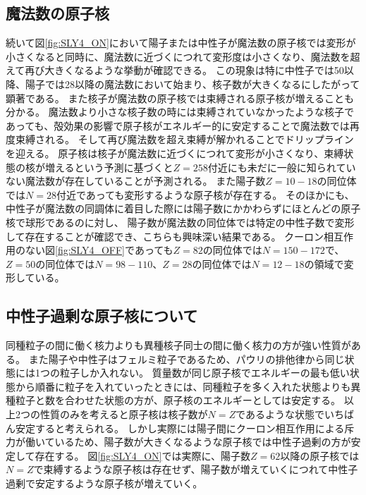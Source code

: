 \documentclass[12pt]{jarticle}
\begin{document}
\subsection{魔法数の原子核}
続いて図\ref{fig:SLY4_ON}において陽子または中性子が魔法数の原子核では変形が小さくなると同時に、魔法数に近づくにつれて変形度は小さくなり、魔法数を超えて再び大きくなるような挙動が確認できる。
この現象は特に中性子では50以降、陽子では28以降の魔法数において始まり、核子数が大きくなるにしたがって顕著である。
また核子が魔法数の原子核では束縛される原子核が増えることも分かる。
魔法数より小さな核子数の時には束縛されていなかったような核子であっても、殻効果の影響で原子核がエネルギー的に安定することで魔法数では再度束縛される。
そして再び魔法数を超え束縛が解かれることでドリップラインを迎える。
原子核は核子が魔法数に近づくにつれて変形が小さくなり、束縛状態の核が増えるという予測に基づくと$Z=258$付近にも未だに一般に知られていない魔法数が存在していることが予測される。
また陽子数$Z=10-18$の同位体では$N=28$付近であっても変形するような原子核が存在する。
そのほかにも、中性子が魔法数の同調体に着目した際には陽子数にかかわらずにほとんどの原子核で球形であるのに対し、
陽子数が魔法数の同位体では特定の中性子数で変形して存在することが確認でき、こちらも興味深い結果である。
クーロン相互作用のない図\ref{fig:SLY4_OFF}であっても$Z=82$の同位体では$N=150-172$で、
$Z=50$の同位体では$N=98-110$、$Z=28$の同位体では$N=12-18$の領域で変形している。

\subsection{中性子過剰な原子核について}
同種粒子の間に働く核力よりも異種核子同士の間に働く核力の方が強い性質がある。
また陽子や中性子はフェルミ粒子であるため、パウリの排他律から同じ状態には1つの粒子しか入れない。
質量数が同じ原子核でエネルギーの最も低い状態から順番に粒子を入れていったときには、同種粒子を多く入れた状態よりも異種粒子と数を合わせた状態の方が、原子核のエネルギーとしては安定する。
以上2つの性質のみを考えると原子核は核子数が$N=Z$であるような状態でいちばん安定すると考えられる。
しかし実際には陽子間にクーロン相互作用による斥力が働いているため、陽子数が大きくなるような原子核では中性子過剰の方が安定して存在する。
図\ref{fig:SLY4_ON}では実際に、陽子数$Z=62$以降の原子核では$N=Z$で束縛するような原子核は存在せず、陽子数が増えていくにつれて中性子過剰で安定するような原子核が増えていく。

\end{document}
